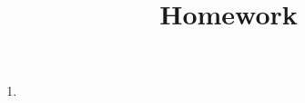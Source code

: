 \documentclass{article}
\title{\textbf{Homework \hwnumber}\\ \Large\course}
\author{\deets}
\newcommand\deets{Insert Name}						%
\newcommand\course{Course Name}						%
\newcommand\semester{Spring 2018}           			%
\newcommand\hwnumber{1}								%
\newcommand{\coverpage}{\thispagestyle{empty}
\vspace*{\fill}
\begin{center}
\textbf{\huge Homework \hwnumber}\\\vspace{1em}
{\Large \course\\\vspace{0.5em}\semester}\vspace{3em}\\
{\Large \deets}\vspace{22em}
\end{center}
\vspace*{\fill}\newpage}
\begin{document}
\maketitle

\begin{enumerate}[leftmargin=*]

\item 

	
	
	
	
	
	
	
	
	
	
	
	
\end{enumerate}	
\end{document}
